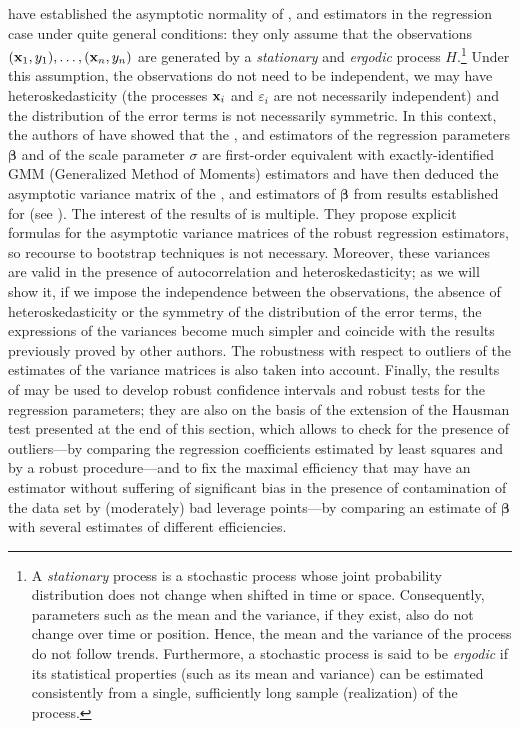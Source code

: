 \citet{Croux:2003} have established the asymptotic normality of ,
 and  estimators in the regression case under quite general
conditions: they only assume that the observations $(\mathbf x_1, y_1), \dots,
(\mathbf x_n, y_n)$ are generated by a \emph{stationary} and \emph{ergodic}
process $H$.\footnote{A \emph{stationary} process is a stochastic process whose
joint probability distribution does not change when shifted in time or space.
Consequently, parameters such as the mean and the variance, if they exist, also
do not change over time or position. Hence, the mean and the variance of the
process do not follow trends. Furthermore, a stochastic process is said to be
\emph{ergodic} if its statistical properties (such as its mean and variance)
can be estimated consistently from a single, sufficiently long sample
(realization) of the process.} Under this assumption, the observations do not
need to be independent, we may have heteroskedasticity (the processes
$\mathbf x_i$ and $\varepsilon_i$ are not necessarily independent) and the
distribution of the error terms is not necessarily symmetric. In this context,
the authors of \citet{Croux:2003} have showed that the ,  and
 estimators of the regression parameters $\boldsymbol\beta$ and of the
scale parameter $\sigma$ are first-order equivalent with exactly-identified GMM
(Generalized Method of Moments) estimators and have then deduced the asymptotic
variance matrix of the ,  and  estimators of
$\boldsymbol\beta$ from results established for  (see
\citealp{Hansen:1982}). The interest of the results of \citet{Croux:2003} is
multiple. They propose explicit formulas for the asymptotic variance matrices
of the robust regression estimators, so recourse to bootstrap techniques is not
necessary. Moreover, these variances are valid in the presence of
autocorrelation and heteroskedasticity; as we will show it, if we impose the
independence between the observations, the absence of heteroskedasticity or the
symmetry of the distribution of the error terms, the expressions of the
variances become much simpler and coincide with the results previously proved
by other authors. The robustness with respect to outliers of the estimates of
the variance matrices is also taken into account. Finally, the results of
\citet{Croux:2003} may be used to develop robust confidence intervals and
robust tests for the regression parameters; they are also on the basis of the
extension of the Hausman test presented at the end of this section, which
allows to check for the presence of outliers---by comparing the regression
coefficients estimated by least squares and by a robust 
procedure---and to fix the maximal efficiency that may have an 
estimator without suffering of significant bias in the presence of
contamination of the data set by (moderately) bad leverage points---by
comparing an  estimate of $\boldsymbol\beta$ with several 
estimates of different efficiencies.

